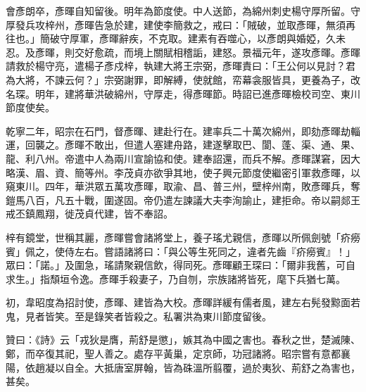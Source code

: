\begin{pinyinscope}
 會彥朗卒，彥暉自知留後。明年為節度使。中人送節，為綿州刺史楊守厚所留。守厚發兵攻梓州，彥暉告急於建，建使李簡救之，戒曰：「賊破，並取彥暉，無須再往也。」簡破守厚軍，彥暉辭疾，不克取。建素有吞噬心，以彥朗與婚婭，久未忍。及彥暉，則交好愈疏，而境上關賦相稽詬，建怒。景福元年，遂攻彥暉。彥暉請救於楊守亮，遣楊子彥戍梓，執建大將王宗弼，彥暉責曰：「王公何以見討？君為大將，不諫云何？」宗弼謝罪，即解縛，使就館，帟幕衾服皆具，更養為子，改名琛。明年，建將華洪破綿州，守厚走，得彥暉節。時詔已進彥暉檢校司空、東川節度使矣。



 乾寧二年，昭宗在石門，督彥暉、建赴行在。建率兵二十萬次綿州，即劾彥暉劫輜運，回襲之。彥暉不敢出，但遣人塞建舟路，建遂擊取巴、閬、蓬、渠、通、果、龍、利八州。帝遣中人為兩川宣諭協和使。建奉詔還，而兵不解。彥暉謀窘，因大略漢、眉、資、簡等州。李茂貞亦欲爭其地，使子興元節度使繼密引軍救彥暉，以窺東川。四年，華洪眾五萬攻彥暉，取渝、昌、普三州，壁梓州南，敗彥暉兵，奪鎧馬八百，凡五十戰，圍遂固。帝仍遣左諫議大夫李洵諭止，建拒命。帝以嗣郯王戒丕鎮鳳翔，徙茂貞代建，皆不奉詔。



 梓有鏡堂，世稱其麗，彥暉嘗會諸將堂上，養子瑤尤親信，彥暉以所佩劍號「疥癆賓」佩之，使侍左右。嘗語諸將曰：「與公等生死同之，違者先齒『疥癆賓』！」眾曰：「諾。」及圍急，瑤請聚親信飲，得同死。彥暉顧王琛曰：「爾非我舊，可自求生。」指頹垣令逸。彥暉手殺妻子，乃自刎，宗族諸將皆死，麾下兵猶七萬。



 初，韋昭度為招討使，彥暉、建皆為大校。彥暉詳緩有儒者風，建左右髡發黥面若鬼，見者皆笑。至是錄笑者皆殺之。私署洪為東川節度留後。



 贊曰：《詩》云「戎狄是膺，荊舒是懲」，嫉其為中國之害也。春秋之世，楚滅陳、鄭，而卒復其祀，聖人善之。處存平黃巢，定京師，功冠諸將。昭宗嘗有意都襄陽，依趙凝以自全。大抵唐室屏翰，皆為硃溫所翦覆，過於夷狄、荊舒之為害也，甚矣。



\end{pinyinscope}